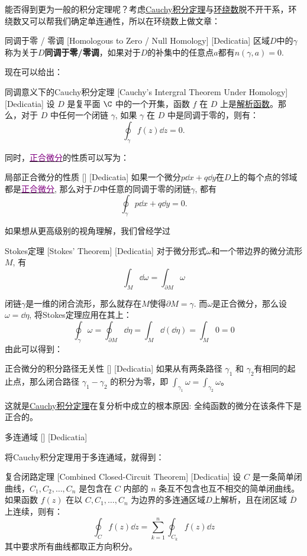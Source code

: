 \documentclass[UTF8]{ctexart}
\newcommand{\hyperrefc}[2]{\hyperref[#1]{\textcolor{purple}{#2}}}
\newcommand{\AnalyticalFunction}{\hyperref[dfn:AnalyticalFunction]{解析函数}}
\newcommand{\CauchyThm}{\hyperref[thm:Cauchy]{Cauchy积分定理}}
\begin{document}
能否得到更为一般的积分定理呢？考虑\CauchyThm 与\hyperref[dfn:WindingNumber]{环绕数}脱不开干系，环绕数又可以帮我们确定单连通性，所以在环绕数上做文章：
\begin{dfn}
    [NullHomologous]
    {同调于零 / 零调}
    [Homologous to Zero / Null Homology]
    [Dedicatia]
    区域$D$中的$\gamma$称为关于$D$\textbf{同调于零/零调}，如果对于$D$的补集中的任意点$a$都有$n(\gamma,a)=0$.
\end{dfn}
现在可以给出：
\begin{thm}
    [UUID]
    {同调意义下的Cauchy积分定理}
    [Cauchy's Intergral Theorem Under Homology]
    [Dedicatia]
    设 \(D\) 是复平面 \(\C\) 中的一个开集，函数 \(f\) 在 \(D\) 上是\AnalyticalFunction 。那么，对于 \( D \) 中任何一个闭链 \( \gamma \), 如果 \( \gamma \) 在 \( D \) 中是同调于零的，则有：
    \[\oint_{\gamma} f(z) \dd z = 0.\]
\end{thm}
同时，\hyperrefc{dfn:ExactDifferential}{正合微分}的性质可以写为：
\begin{ppt}
    [UUID]
    {局部正合微分的性质}
    []
    [Dedicatia]
    如果一个微分$p\dd{x}+q\dd{y}$在$D$上的每个点的邻域都是\hyperrefc{dfn:ExactDifferential}{正合微分}, 那么对于$D$中任意的同调于零的闭链$\gamma$, 都有
    \[\oint_\gamma p\dd{x}+q\dd{y}=0.\]
\end{ppt}
如果想从更高级别的视角理解，我们曾经学过
\begin{thm}
    [UUID]
    {Stokes定理}
    [Stokes' Theorem]
    [Dedicatia]
    对于微分形式$\omega$和一个带边界的微分流形$M$, 有
    \[\int_{M} \dd\omega = \int_{\partial M} \omega\]
\end{thm}
闭链$\gamma$是一维的闭合流形，那么就存在$M$使得$\partial M=\gamma$. 而$\omega$是正合微分，那么设$\omega=\dd{\eta}$, 将Stokes定理应用在其上：
\[\oint_{\gamma} \omega = \oint_{\partial M} \dd\eta = \int_{M} \dd(\dd\eta) = \int_{M} 0 = 0\]
由此可以得到：
\begin{ppt}
    [UUID]
    {正合微分的积分路径无关性}
    []
    [Dedicatia]
    如果从有两条路径 $\gamma_1$ 和 $\gamma_2$有相同的起止点，那么闭合路径 $\gamma_1 - \gamma_2$ 的积分为零，即 $\int_{\gamma_1} \omega = \int_{\gamma_2} \omega$。
\end{ppt}
这就是\CauchyThm 在复分析中成立的根本原因: 全纯函数的微分在该条件下是正合的。
\begin{dfn}
    [UUID]
    {多连通域}
    []
    [Dedicatia]
\end{dfn}
将Cauchy积分定理用于多连通域，就得到：
\begin{thm}
    [CombinedClosedCircuit]
    {复合闭路定理}
    [Combined Closed-Circuit Theorem]
    [Dedicatia]
    设 $C$ 是一条简单闭曲线，$C_1, C_2, \ldots, C_n$ 是包含在 $C$ 内部的 $n$ 条互不包含也互不相交的简单闭曲线。如果函数 $f(z)$ 在以 $C, C_1, \ldots, C_n$ 为边界的多连通区域$D$上解析，且在闭区域 $\overline{D}$ 上连续，则有：
    $$\oint_C f(z) \dd z = \sum_{k=1}^n \oint_{C_k} f(z) \dd z$$
    其中要求所有曲线都取正方向积分。
\end{thm}
\end{document}

